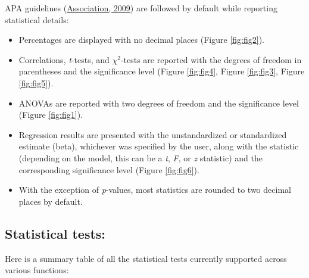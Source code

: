 \documentclass[
]{article}
\begin{document}
APA guidelines (\protect\hyperlink{ref-associationPublicationManualAmerican2009}{Association, 2009}) are followed by
default while reporting statistical details:

\begin{itemize}
\item
  Percentages are displayed with no decimal places (Figure \ref{fig:fig2}).
\item
  Correlations, \emph{t}-tests, and \(\chi^2\)-tests are reported with the degrees
  of freedom in parentheses and the significance level (Figure \ref{fig:fig4},
  Figure \ref{fig:fig3}, Figure \ref{fig:fig5}).
\item
  ANOVAs are reported with two degrees of freedom and the significance level
  (Figure \ref{fig:fig1}).
\item
  Regression results are presented with the unstandardized or standardized
  estimate (beta), whichever was specified by the user, along with the
  statistic (depending on the model, this can be a \emph{t}, \emph{F}, or \emph{z} statistic)
  and the corresponding significance level (Figure \ref{fig:fig6}).
\item
  With the exception of \emph{p}-values, most statistics are rounded to two decimal
  places by default.
\end{itemize}

\hypertarget{statistical-tests}{%
\subsection{Statistical tests:}\label{statistical-tests}}

Here is a summary table of all the statistical tests currently supported across
various functions:
\end{document}
